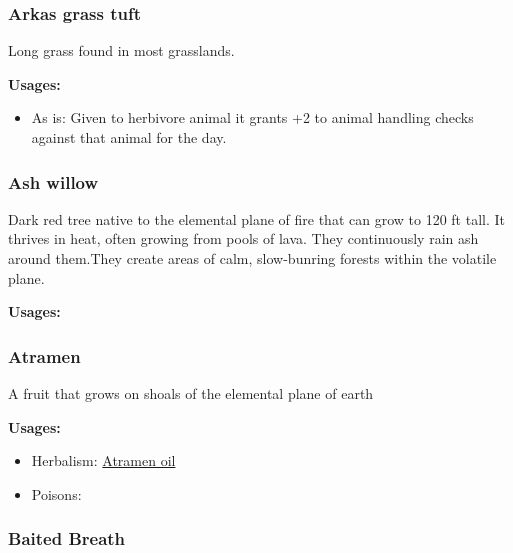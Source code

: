 \subsubsection{Arkas grass tuft}
\label{Arkas grass tuft}

Long grass found in most grasslands.

\vspace{5mm}

\textbf{Usages:}

\begin{itemize}[noitemsep]
\item[] As is: Given to herbivore animal it grants +2 to animal handling checks against that animal for the day.
\end{itemize}

\subsubsection{Ash willow}
\label{Ash willow}

Dark red tree native to the elemental plane of fire that can grow to 120 ft tall. It thrives in heat, often growing from pools of lava. They continuously rain ash around them.They create areas of calm, slow-bunring forests within the volatile plane.

\vspace{5mm}

\textbf{Usages:}


\subsubsection{Atramen}
\label{Atramen}

A fruit that grows on shoals of the elemental plane of earth

\vspace{5mm}

\textbf{Usages:}

\begin{itemize}[noitemsep]
\item[] Herbalism: \hyperref[Atramen oil]{Atramen oil}
\item[] Poisons: \poison
\end{itemize}

\subsubsection{Baited Breath}
\label{baited_breath}

